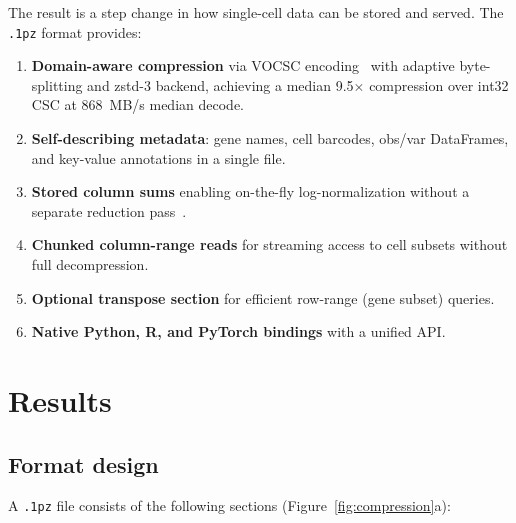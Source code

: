 \documentclass[10pt,twocolumn,letterpaper]{article}
\begin{document}
The result is a step change in how single-cell data can be stored and served.
The \texttt{.1pz} format provides:
\begin{enumerate}
\item \textbf{Domain-aware compression} via VOCSC encoding~\cite{wolfgang2024vcsc,ruiter2024vcsc,ruiter2024vcsc_dcc} with adaptive byte-splitting and zstd-3 backend, achieving a median 9.5$\times$ compression over int32 CSC at 868~MB/s median decode.
\item \textbf{Self-describing metadata}: gene names, cell barcodes, obs/var DataFrames, and key-value annotations in a single file.
\item \textbf{Stored column sums} enabling on-the-fly log-normalization without a separate reduction pass~\cite{stuart2019comprehensive}.
\item \textbf{Chunked column-range reads} for streaming access to cell subsets without full decompression.
\item \textbf{Optional transpose section} for efficient row-range (gene subset) queries.
\item \textbf{Native Python, R, and PyTorch bindings} with a unified API.
\end{enumerate}

\section{Results}

\subsection{Format design}

A \texttt{.1pz} file consists of the following sections (Figure~\ref{fig:compression}a):
\end{document}

